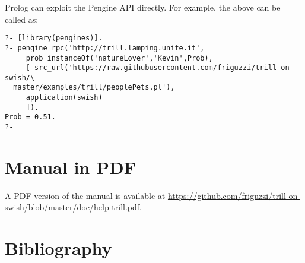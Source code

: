 \documentclass[a4paper,10pt]{scrartcl}
\begin{document}
Prolog can exploit the Pengine API directly.  For example, the above can
be called as:
\begin{verbatim}
?- [library(pengines)].
?- pengine_rpc('http://trill.lamping.unife.it',
     prob_instanceOf('natureLover','Kevin',Prob),
     [ src_url('https://raw.githubusercontent.com/friguzzi/trill-on-swish/\
  master/examples/trill/peoplePets.pl'),
     application(swish)
     ]).
Prob = 0.51.
?-
\end{verbatim}

\section{Manual in PDF}
A PDF version of the manual is available at
\url{https://github.com/friguzzi/trill-on-swish/blob/master/doc/help-trill.pdf}.
\section{Bibliography}


\end{document}
